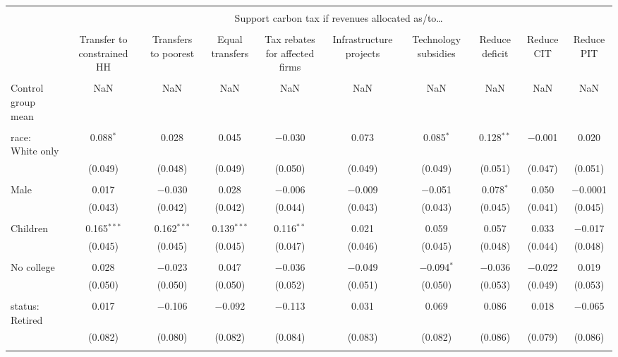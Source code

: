 
\begin{tabular}{@{\extracolsep{5pt}}lccccccccc} 
\\[-1.8ex]\hline 
\hline \\[-1.8ex] 
 & \multicolumn{9}{c}{Support carbon tax if revenues allocated as/to…} \\ 
\cline{2-10} 
\\[-1.8ex] & Transfer to constrained HH & Transfers to poorest & Equal transfers & Tax rebates for affected firms & Infrastructure projects & Technology subsidies & Reduce deficit & Reduce CIT & Reduce PIT \\ 
\hline \\[-1.8ex] 
 Control group mean & NaN & NaN & NaN & NaN & NaN & NaN & NaN & NaN & NaN  \\ \hline \\[-1.8ex] race: White only & 0.088$^{*}$ & 0.028 & 0.045 & $-$0.030 & 0.073 & 0.085$^{*}$ & 0.128$^{**}$ & $-$0.001 & 0.020 \\ 
  & (0.049) & (0.048) & (0.049) & (0.050) & (0.049) & (0.049) & (0.051) & (0.047) & (0.051) \\ 
  & & & & & & & & & \\ 
 Male & 0.017 & $-$0.030 & 0.028 & $-$0.006 & $-$0.009 & $-$0.051 & 0.078$^{*}$ & 0.050 & $-$0.0001 \\ 
  & (0.043) & (0.042) & (0.042) & (0.044) & (0.043) & (0.043) & (0.045) & (0.041) & (0.045) \\ 
  & & & & & & & & & \\ 
 Children & 0.165$^{***}$ & 0.162$^{***}$ & 0.139$^{***}$ & 0.116$^{**}$ & 0.021 & 0.059 & 0.057 & 0.033 & $-$0.017 \\ 
  & (0.045) & (0.045) & (0.045) & (0.047) & (0.046) & (0.045) & (0.048) & (0.044) & (0.048) \\ 
  & & & & & & & & & \\ 
 No college & 0.028 & $-$0.023 & 0.047 & $-$0.036 & $-$0.049 & $-$0.094$^{*}$ & $-$0.036 & $-$0.022 & 0.019 \\ 
  & (0.050) & (0.050) & (0.050) & (0.052) & (0.051) & (0.050) & (0.053) & (0.049) & (0.053) \\ 
  & & & & & & & & & \\ 
 status: Retired & 0.017 & $-$0.106 & $-$0.092 & $-$0.113 & 0.031 & 0.069 & 0.086 & 0.018 & $-$0.065 \\ 
  & (0.082) & (0.080) & (0.082) & (0.084) & (0.083) & (0.082) & (0.086) & (0.079) & (0.086) \\ 
  & & & & & & & & & \\ 

\end{tabular}
